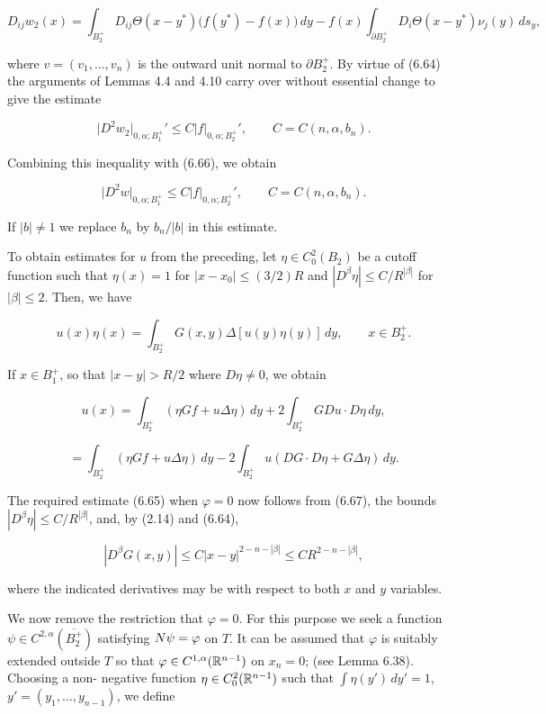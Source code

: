 \begin{equation*}
D_{ij}w_2(x)=\int_{B_2^+}D_{ij}\Theta(x-y^*)\bigl(f(y^*)-f(x)\bigr)\,dy
 -f(x)\int_{\partial B_2^+}D_i\Theta(x-y^*)\nu_j(y)\,ds_y,
\end{equation*}





\noindent where $v=(v_1,\dots,v_n)$ is the outward unit normal to $\partial B_2^+$. By virtue of (6.64) the
arguments of Lemmas 4.4 and 4.10 carry over without essential change to give the
estimate

\[
\bigl|D^2 w_2\bigr|_{0,\alpha; B_1^+}' \leq C|f|_{0,\alpha; B_2^+}', \qquad C=C(n,\alpha,b_n).
\]

\noindent Combining this inequality with (6.66), we obtain

\begin{equation}
\tag{6.67}
\bigl|D^2 w\bigr|_{0,\alpha; B_1^+} \leq C|f|_{0,\alpha; B_2^+}', \qquad C=C(n,\alpha,b_n).
\end{equation}

\noindent If $|b|\neq 1$ we replace $b_n$ by $b_n/|b|$ in this estimate.
\par To obtain estimates for $u$ from the preceding, let $\eta \in C_0^2(B_2)$ be a cutoff function
such that $\eta(x)=1$ for $|x-x_0|\leq (3/2)R$ and $|D^\beta \eta|\leq C/R^{|\beta|}$ for $|\beta|\leq 2$. Then, we
have

\[
u(x)\eta(x)=\int_{B_2^+} G(x,y)\Delta[u(y)\eta(y)]\,dy, \qquad x\in B_2^+.
\]

\noindent If $x\in B_1^+$, so that $|x-y|>R/2$ where $D\eta\neq 0$, we obtain

\[
u(x)=\int_{B_2^+} (\eta Gf + u\Delta\eta)\,dy + 2\int_{B_2^+} GDu\cdot D\eta\,dy,
\]

\[
=\int_{B_2^+} (\eta Gf + u\Delta\eta)\,dy - 2\int_{B_2^+} u(DG\cdot D\eta + G\Delta\eta)\,dy.
\]

\noindent The required estimate (6.65) when $\varphi=0$ now follows from (6.67), the bounds
$|D^\beta\eta|\leq C/R^{|\beta|}$, and, by (2.14) and (6.64),

\[
|D^\beta G(x,y)|\leq C|x-y|^{2-n-|\beta|}\leq CR^{2-n-|\beta|},
\]

\noindent where the indicated derivatives may be with respect to both $x$ and $y$ variables.
\par We now remove the restriction that $\varphi=0$. For this purpose we seek a function
$\psi\in C^{2,\alpha}(\overline{B_2^+})$ satisfying $N\psi=\varphi$ on $T$. It can be assumed that $\varphi$ is suitably extended
outside $T$ so that $\varphi\in C^{1,\alpha}(\mathbb{R}^{n-1})$ on $x_n=0$; (see Lemma 6.38). Choosing a non-
negative function $\eta\in C_0^2(\mathbb{R}^{n-1})$ such that $\int \eta(y')\,dy'=1$, $y'=(y_1,\dots,y_{n-1})$, we
define

